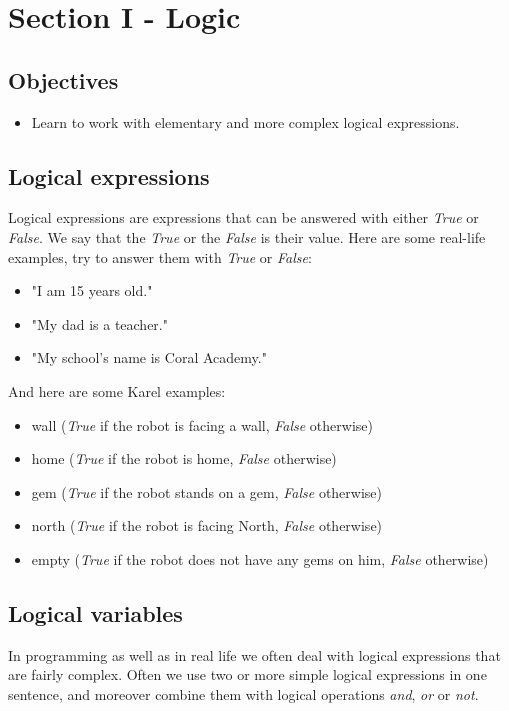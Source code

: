 \documentclass[article,A4,12pt]{llncs}
\begin{document}
{{{{\section{Section I - Logic}

\subsection{Objectives} 
 
\begin{itemize}
\item Learn to work with elementary and more complex logical expressions.
\end{itemize}

\subsection{Logical expressions}
Logical expressions are expressions that can be answered with either {\em True} or 
{\em False}. We say that the {\em True} or the {\em False} is their value. Here are some 
real-life examples, try to answer them with {\em True} or {\em False}:

\begin{itemize}
\item "I am 15 years old."
\item "My dad is a teacher."
\item "My school's name is Coral Academy."
\end{itemize}
And here are some Karel examples:
\begin{itemize}
\item wall ({\em True} if the robot is facing a wall, {\em False} otherwise)
\item home ({\em True} if the robot is home, {\em False} otherwise)
\item gem ({\em True} if the robot stands on a gem, {\em False} otherwise)
\item north ({\em True} if the robot is facing North, {\em False} otherwise)
\item empty ({\em True} if the robot does not have any gems on him, {\em False} otherwise)
\end{itemize}

\subsection{Logical variables}

In programming as well as in real life we often deal with logical expressions that are 
fairly complex. Often we use two or more simple logical expressions in one sentence, 
and moreover combine them with logical operations {\em and}, {\em or} or {\em not}.

}}}}
\end{document}
